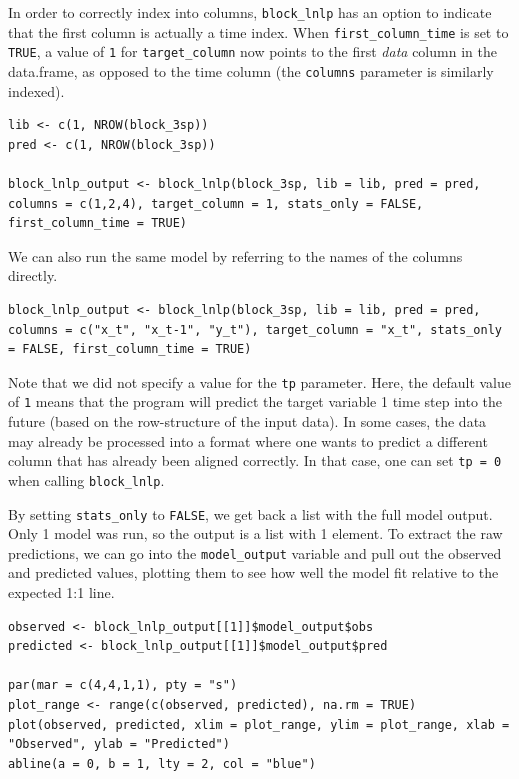 In order to correctly index into columns, \lstinline{block_lnlp} has an option to indicate that the first column is actually a time index. When \lstinline{first_column_time} is set to \lstinline{TRUE}, a value of \lstinline{1} for \lstinline{target_column} now points to the first \emph{data} column in the data.frame, as opposed to the time column (the \lstinline{columns} parameter is similarly indexed).

\begin{lstlisting}
lib <- c(1, NROW(block_3sp))
pred <- c(1, NROW(block_3sp))

block_lnlp_output <- block_lnlp(block_3sp, lib = lib, pred = pred, columns = c(1,2,4), target_column = 1, stats_only = FALSE, first_column_time = TRUE)
\end{lstlisting}

We can also run the same model by referring to the names of the columns directly.

\begin{lstlisting}
block_lnlp_output <- block_lnlp(block_3sp, lib = lib, pred = pred, columns = c("x_t", "x_t-1", "y_t"), target_column = "x_t", stats_only = FALSE, first_column_time = TRUE)
\end{lstlisting}

Note that we did not specify a value for the \lstinline{tp} parameter. Here, the default value of \lstinline{1} means that the program will predict the target variable 1 time step into the future (based on the row-structure of the input data). In some cases, the data may already be processed into a format where one wants to predict a different column that has already been aligned correctly. In that case, one can set \lstinline{tp = 0} when calling \lstinline{block_lnlp}.

By setting \lstinline{stats_only} to \lstinline{FALSE}, we get back a list with the full model output. Only 1 model was run, so the output is a list with 1 element. To extract the raw predictions, we can go into the \lstinline{model_output} variable and pull out the observed and predicted values, plotting them to see how well the model fit relative to the expected 1:1 line.

\begin{lstlisting}
observed <- block_lnlp_output[[1]]$model_output$obs
predicted <- block_lnlp_output[[1]]$model_output$pred

par(mar = c(4,4,1,1), pty = "s")
plot_range <- range(c(observed, predicted), na.rm = TRUE)
plot(observed, predicted, xlim = plot_range, ylim = plot_range, xlab = "Observed", ylab = "Predicted")
abline(a = 0, b = 1, lty = 2, col = "blue")
\end{lstlisting}

